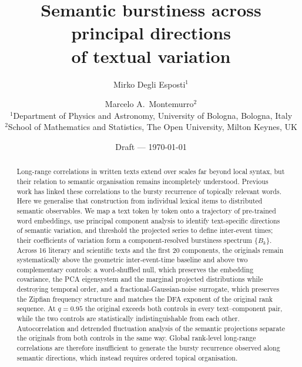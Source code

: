 \documentclass[12pt,a4paper]{article}
\begin{document}
\title{Semantic burstiness across principal directions\\
       of textual variation}

\author{Mirko Degli Esposti$^{1}$ \and Marcelo A.\ Montemurro$^{2}$\\[6pt]
  \small $^1$Department of Physics and Astronomy,
         University of Bologna, Bologna, Italy\\
  \small $^2$School of Mathematics and Statistics,
         The Open University, Milton Keynes, UK}

\date{\small Draft --- \today}

\maketitle

\begin{abstract}
Long-range correlations in written texts extend over scales far beyond
local syntax, but their relation to semantic organisation remains
incompletely understood. Previous work has linked these correlations to
the bursty recurrence of topically relevant words. Here we generalise
that construction from individual lexical items to distributed semantic
observables. We map a text token by token onto a trajectory of
pre-trained word embeddings, use principal component analysis to
identify text-specific directions of semantic variation, and threshold
the projected series to define inter-event times; their coefficients of
variation form a component-resolved burstiness spectrum $\{B_k\}$.
Across 16 literary and scientific texts and the first 20 components,
the originals remain systematically above the geometric
inter-event-time baseline and above two complementary controls: a
word-shuffled null, which preserves the embedding covariance, the PCA
eigensystem and the marginal projected distributions while destroying
temporal order, and a fractional-Gaussian-noise surrogate, which
preserves the Zipfian frequency structure and matches the DFA exponent
of the original rank sequence. At $q=0.95$ the original exceeds both
controls in every text--component pair, while the two controls are
statistically indistinguishable from each other. Autocorrelation and
detrended fluctuation analysis of the semantic projections separate the
originals from both controls in the same way. Global rank-level
long-range correlations are therefore insufficient to generate the
bursty recurrence observed along semantic directions, which instead
requires ordered topical organisation.
\end{abstract}
\end{document}
